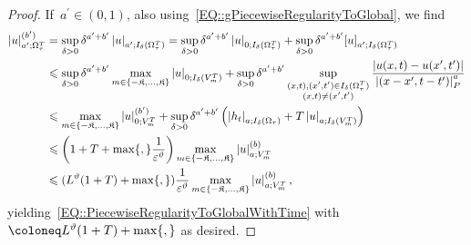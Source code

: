 \documentclass[12pt,a4paper]{amsart}
\makeatletter
\numberwithin{equation}{section}
\theoremstyle{definition}
\theoremstyle{remark}
\newcommand{\eps}{\varepsilon}
\newcommand{\abs}[1]{\left\lvert#1\right\rvert}
\renewcommand{\leq}{\leqslant}
\newcommand{\const}[1]{%
  \csname const@#1\endcsname%
}
\makeatother
\begin{document}
\begin{proof}
    If~$a^\prime \in (0,1)$, also using~\eqref{EQ::gPiecewiseRegularityToGlobal}, we find
    \begin{equation}
        \begin{split}
            \abs{u}_{a^\prime; \Omega_\tau^T}^{(b^\prime)} &= \sup_{\delta > 0} \delta^{a^\prime + b^\prime} \abs{u}_{a^\prime; I_\delta(\Omega_\tau^T)} = \sup_{\delta > 0} \delta^{a^\prime + b^\prime}\abs{u}_{0; I_\delta(\Omega_\tau^T)} + \sup_{\delta > 0} \delta^{a^\prime + b^\prime}{[u]}_{a^\prime; I_\delta(\Omega_\tau^T)}\\
                &\leq \sup_{\delta > 0} \delta^{a^\prime + b^\prime}\max_{m \in \{-\mathfrak{K},\dots,\mathfrak{K}\}}\abs{u}_{0; I_\delta(V_m^T)} + \sup_{\delta > 0}\delta^{a^\prime+b^\prime} \sup_{\substack{(x,t),(x^\prime,t^\prime) \in I_\delta(\Omega_\tau^T)\\(x,t)\neq(x^\prime,t^\prime)}}\frac{\abs{u(x,t)-u(x^\prime,t^\prime)}}{\abs{(x-x^\prime,t-t^\prime)}_P^a}\\
                &\leq \max_{m \in \{-\mathfrak{K},\dots,\mathfrak{K}\}} \abs{u}_{0; V_m^T}^{(b^\prime)} + \sup_{\delta>0}\delta^{a^\prime+b^\prime} \left(\abs{h_t}_{a; I_\delta(\Omega_\tau)} + T\abs{u}_{a;I_\delta(V_m^T)}\right)\\
                &\leq \left(1+T+\max\{\const{CONST::PiecewiseRegularityToGlobal},\const{CONST::PiecewiseLipschitzToGlobalLipschitz}\}\frac{1}{\eps^\vartheta}\right) \max_{m \in \{-\mathfrak{K},\dots,\mathfrak{K}\}} \abs{u}_{a; V_m^T}^{(b)}\\
                &\leq (L^\vartheta(1+T)+\max\{\const{CONST::PiecewiseRegularityToGlobal},\const{CONST::PiecewiseLipschitzToGlobalLipschitz}\})\frac{1}{\eps^\vartheta}\max_{m \in \{-\mathfrak{K},\dots,\mathfrak{K}\}} \abs{u}_{a; V_m^T}^{(b)},
        \end{split}
    \end{equation}
    yielding~\eqref{EQ::PiecewiseRegularityToGlobalWithTime} with~$\const{CONST::PiecewiseRegularityToGlobalWithTime} \coloneq L^\vartheta(1+T)+\max\{\const{CONST::PiecewiseRegularityToGlobal},\const{CONST::PiecewiseLipschitzToGlobalLipschitz}\}$ as desired.


\end{proof}
\end{document}
